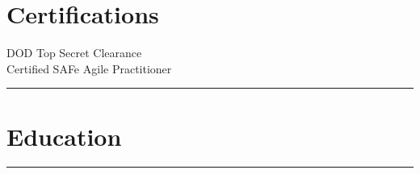 \documentclass[letterpaper]{deedy-resume}
\begin{document}
\begin{minipage}[t]{0.3\textwidth}
\section{Certifications}

\vspace{1em}

\textbullet{} DOD Top Secret Clearance\\
\textbullet{} Certified SAFe\textregistered{} Agile Practitioner\\
\sectionspace
\vspace{-1ex}
\rule{5cm}{0.5pt}


\vspace{2em}
\section{Education}
\vspace{1em}

\vspace{0.5em}


{}


\sectionspace
\vspace{-1ex}
\rule{5cm}{0.5pt}

\vspace{2em}

\end{minipage}
\end{document}
